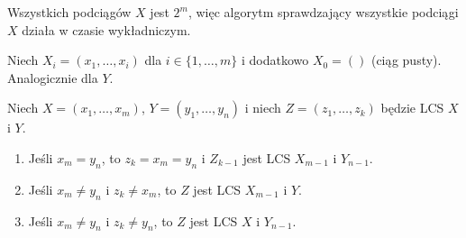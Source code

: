 Wszystkich podciągów $X$ jest $2^m$, więc algorytm sprawdzający wszystkie podciągi $X$ działa w czasie wykładniczym.

Niech $X_i = (x_1, \dots, x_i)$ dla $i \in \{1, \dots, m\}$ i dodatkowo $X_0 = ()$ (ciąg pusty). Analogicznie dla $Y$.

\begin{lemma}
	Niech $X = (x_1, \dots, x_m)$, $Y = (y_1, \dots, y_n)$ i niech $Z = (z_1, \dots, z_k)$ będzie LCS $X$ i $Y$.
	\begin{enumerate}
		\item Jeśli $x_m = y_n$, to $z_k = x_m = y_n$ i $Z_{k-1}$ jest LCS $X_{m-1}$ i $Y_{n-1}$.
		\item Jeśli $x_m \neq y_n$ i $z_k \neq x_m$, to $Z$ jest LCS $X_{m-1}$ i $Y$.
		\item Jeśli $x_m \neq y_n$ i $z_k \neq y_n$, to $Z$ jest LCS $X$ i $Y_{n-1}$.
	\end{enumerate}
\end{lemma}


